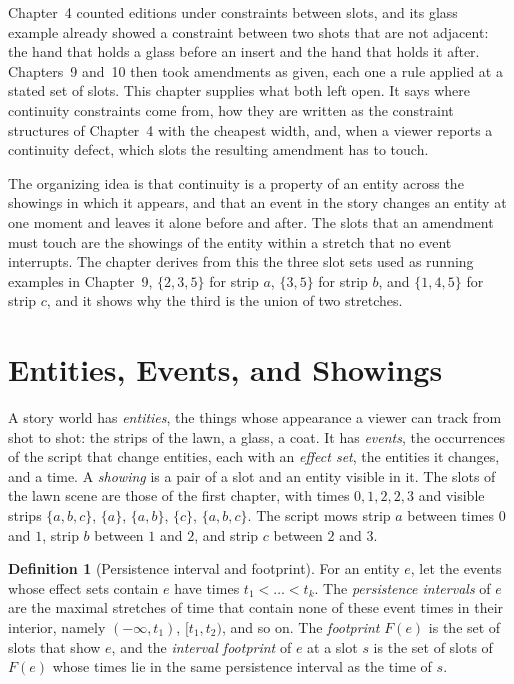 \documentclass[11pt,twoside,openright]{book}
\theoremstyle{plain}
\theoremstyle{definition}
\newtheorem{definition}[theorem]{Definition}
\theoremstyle{remark}
\begin{document}
Chapter~4 counted editions under constraints between slots, and its glass example already showed a constraint between two shots that are not adjacent: the hand that holds a glass before an insert and the hand that holds it after. Chapters~9 and~10 then took amendments as given, each one a rule applied at a stated set of slots. This chapter supplies what both left open. It says where continuity constraints come from, how they are written as the constraint structures of Chapter~4 with the cheapest width, and, when a viewer reports a continuity defect, which slots the resulting amendment has to touch.

The organizing idea is that continuity is a property of an entity across the showings in which it appears, and that an event in the story changes an entity at one moment and leaves it alone before and after. The slots that an amendment must touch are the showings of the entity within a stretch that no event interrupts. The chapter derives from this the three slot sets used as running examples in Chapter~9, $\{2,3,5\}$ for strip $a$, $\{3,5\}$ for strip $b$, and $\{1,4,5\}$ for strip $c$, and it shows why the third is the union of two stretches.

\section{Entities, Events, and Showings}\label{sec:entities}

A story world has \emph{entities}, the things whose appearance a viewer can track from shot to shot: the strips of the lawn, a glass, a coat. It has \emph{events}, the occurrences of the script that change entities, each with an \emph{effect set}, the entities it changes, and a time. A \emph{showing} is a pair of a slot and an entity visible in it. The slots of the lawn scene are those of the first chapter, with times $0,1,2,2,3$ and visible strips $\{a,b,c\}$, $\{a\}$, $\{a,b\}$, $\{c\}$, $\{a,b,c\}$. The script mows strip $a$ between times $0$ and $1$, strip $b$ between $1$ and $2$, and strip $c$ between $2$ and $3$.

\begin{definition}[Persistence interval and footprint]\label{def:interval}
For an entity $e$, let the events whose effect sets contain $e$ have times $t_1<\dots<t_k$. The \emph{persistence intervals} of $e$ are the maximal stretches of time that contain none of these event times in their interior, namely $(-\infty,t_1)$, $[t_1,t_2)$, and so on. The \emph{footprint} $F(e)$ is the set of slots that show $e$, and the \emph{interval footprint} of $e$ at a slot $s$ is the set of slots of $F(e)$ whose times lie in the same persistence interval as the time of $s$.
\end{definition}
\end{document}
